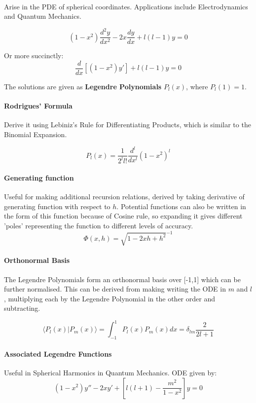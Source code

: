 \documentclass[12pt]{article}
\begin{document}
\paragraph{}
Arise in the PDE of spherical coordinates. Applications include Electrodynamics and Quantum Mechanics. 

\[ (1-x^2)\frac{d^2y}{dx^2} - 2x\frac{dy}{dx} + l(l-1) y = 0\] 

Or more succinctly:
\[ \frac{d}{dx}[(1-x^2)y'] + l(l-1) y = 0\] 

The solutions are given as \textbf{Legendre Polynomials} $P_l(x)$, where $P_l(1) = 1$.


\paragraph{Rodrigues' Formula}
Derive it using Lebiniz's Rule for Differentiating Products, which is similar to the Binomial Expansion.

\[P_l(x) = \frac{1}{2^ll!}\frac{d^l}{dx^l}(1-x^2)^l\]

\paragraph{Generating function}
Useful for making additional recursion relations, derived by taking derivative of generating function with respect to $h$. Potential functions can also be written in the form of this function because of Cosine rule, so expanding it gives different 'poles' representing the function to different levels of accuracy.
\[ \Phi (x,h) = \sqrt{1 - 2xh + h^2}^{-1}\]


\paragraph{Orthonormal Basis}
The Legendre Polynomials form an orthonormal basis over [-1,1] which can be further normalised. This can be derived from making writing the ODE in $m$ and $l$, multiplying each by the Legendre Polynomial in the other order and subtracting.

\[ \langle P_l(x)|P_m(x)\rangle = \int^1_{-1} P_l(x)P_m(x)dx = \delta_{lm} \frac{2}{2l+1}\]

\paragraph{Associated Legendre Functions}
Useful in Spherical Harmonics in Quantum Mechanics. ODE given by:
\[ (1-x^2)y'' - 2xy' + [l(l+1) - \frac{m^2}{1-x^2}]y = 0 \]
\end{document}
